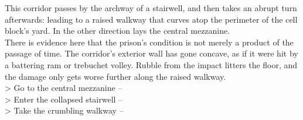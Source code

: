 This corridor passes by the archway of a stairwell, and then takes an abrupt turn afterwards: leading to a raised walkway that curves atop the perimeter of the cell block’s yard. In the other direction lays the central mezzanine.\\

There is evidence here that the prison’s condition is not merely a product of the passage of time. The corridor's exterior wall has gone concave, as if it were hit by a battering ram or trebuchet volley. Rubble from the impact litters the floor, and the damage only gets worse further along the raised walkway.\\

> Go to the central mezzanine -- \\
> Enter the collapsed stairwell -- \\
> Take the crumbling walkway -- 